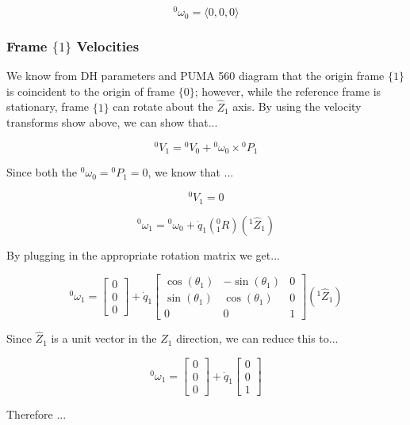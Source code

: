 $$
{}^{0}\omega_{0} = \langle 0,0,0 \rangle
$$


\subsubsection*{Frame $\{ 1 \}$ Velocities}

We know from DH parameters and PUMA 560 diagram that the origin frame $\{ 1 \}$ is coincident to the origin of frame $\{ 0 \}$; however, while the reference frame is stationary, frame $\{ 1 \}$ can rotate about the $\hat{Z}_1$ axis. By using the velocity transforms show above, we can show that...

$$
{}^{0}V_{1} = {}^{0}V_{0} + {}^{0}\omega_{0} \times {}^{0}P_{1}
$$

\noindent Since both the ${}^{0}\omega_{0} = {}^{0}P_{1} =0$, we know that ...


$$
{}^{0}V_{1} = 0
$$

$$
{}^{0}\omega_1 = {}^{0}\omega_{0} + \dot{q}_{1} \left( {}^{0}_{1}R \right) \left( {}^{1}\hat{Z}_{1}\right)
$$


\noindent By plugging in the appropriate rotation matrix we get...

$$
{}^{0}\omega_1 = \begin{bmatrix} 0 \\ 0 \\ 0 \end{bmatrix}
 + \dot{q}_{1} \left[\begin{array}{cccc} \cos\left(\theta _{1}\right) & -\sin\left(\theta _{1}\right) & 0 \\ \sin\left(\theta _{1}\right) & \cos\left(\theta _{1}\right) & 0 \\ 0 & 0 & 1 \end{array}\right] \left( {}^{1}\hat{Z}_{1}\right)
$$


\noindent Since $\hat{Z}_{1}$ is a unit vector in the $Z_1$ direction, we can reduce this to...

$$
{}^{0}\omega_1 = \begin{bmatrix} 0 \\ 0 \\ 0 \end{bmatrix}
 + \dot{q}_{1} \left[\begin{array}{c} 0 \\  0 \\ 1 \end{array}\right]
$$



\noindent Therefore ...

